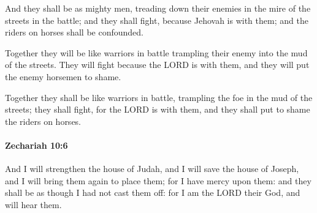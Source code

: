 			\begin{versebox}
					\item[BHS] 
					\item[LXX] 
					\item[ASV] And they shall be as mighty men, treading down their enemies in the mire of the streets in the battle; and they shall fight, because Jehovah is with them; and the riders on horses shall be confounded.
					\item[NIV] Together they will be like warriors in battle trampling their enemy into the mud of the streets. They will fight because the LORD is with them, and they will put the enemy horsemen to shame.
					\item[NRSV] Together they shall be like warriors in battle, trampling the foe in the mud of the streets; they shall fight, for the LORD is with them, and they shall put to shame the riders on horses.
			\end{versebox}

		\paragraph{Zechariah 10:6} %
			\label{ZECHARIAH-10-6}

			And I will strengthen the house of Judah, and I will save the house of Joseph, and I will bring them again to place them; for I have mercy upon them: and they shall be as though I had not cast them off: for I am the LORD their God, and will hear them.

